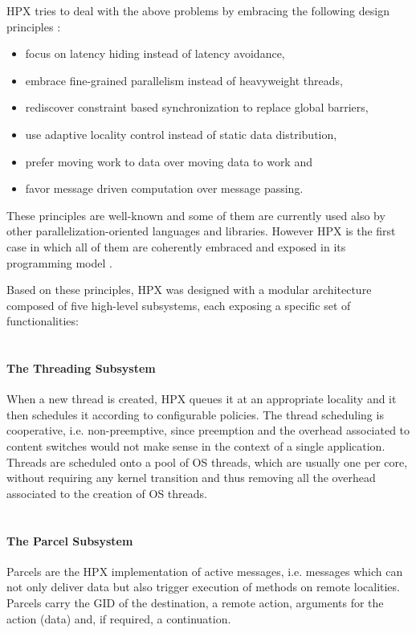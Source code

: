 HPX tries to deal with the above problems by embracing the following design principles \cite{kaiser2014hpx}:
\begin{itemize}
	\item focus on latency hiding instead of latency avoidance,
	\item embrace fine-grained parallelism instead of heavyweight threads,
	\item rediscover constraint based synchronization to replace global barriers,
	\item use adaptive locality control instead of static data distribution, 
	\item prefer moving work to data over moving data to work and 
	\item favor message driven computation over message passing.
\end{itemize}
These principles are well-known and some of them are currently used also by other parallelization-oriented languages and libraries. However HPX is the first case in which all of them are coherently embraced and exposed in its programming model \cite{kaiser2014hpx}.

Based on these principles, HPX was designed with a modular architecture composed of five high-level subsystems, each exposing a specific set of functionalities:
~\\~

\paragraph{The Threading Subsystem}
When a new thread is created, HPX queues it at an appropriate locality and it then schedules it according to configurable policies. The thread scheduling is cooperative, i.e. non-preemptive, since preemption and the overhead associated to content switches would not make sense in the context of a single application. Threads are scheduled onto a pool of OS threads, which are usually one per core, without requiring any kernel transition and thus removing all the overhead associated to the creation of OS threads.
~\\~

\paragraph{The Parcel Subsystem}
Parcels are the HPX implementation of active messages, i.e. messages which can not only deliver data but also trigger execution of methods on remote localities.
Parcels carry the GID of the destination, a remote action, arguments for the action (data) and, if required, a continuation.
~\\~

